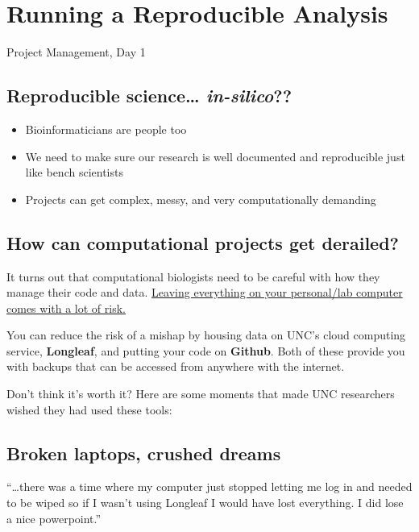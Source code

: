\documentclass[
  letterpaper,
  DIV=11,
  numbers=noendperiod]{scrreprt}
\providecommand{\tightlist}{%
  \setlength{\itemsep}{0pt}\setlength{\parskip}{0pt}}\usepackage{longtable,booktabs,array}
\begin{document}

\chapter{Running a Reproducible
Analysis}\label{running-a-reproducible-analysis}

Project Management, Day 1

\hfill\break

\section{\texorpdfstring{Reproducible science\ldots{}
\emph{in-silico}??}{Reproducible science\ldots{} in-silico??}}\label{reproducible-science-in-silico}

\begin{itemize}
\tightlist
\item
  Bioinformaticians are people too
\item
  We need to make sure our research is well documented and reproducible
  just like bench scientists
\item
  Projects can get complex, messy, and very computationally demanding
\end{itemize}

\section{How can computational projects get
derailed?}\label{how-can-computational-projects-get-derailed}

It turns out that computational biologists need to be careful with how
they manage their code and data. \ul{Leaving everything on your
personal/lab computer comes with a lot of risk.}

You can reduce the risk of a mishap by housing data on UNC's cloud
computing service, \textbf{Longleaf}, and putting your code on
\textbf{Github}. Both of these provide you with backups that can be
accessed from anywhere with the internet.

Don't think it's worth it? Here are some moments that made UNC
researchers wished they had used these tools:

\section{Broken laptops, crushed dreams}

``\ldots there was a time where my computer just stopped letting me log
in and needed to be wiped so if I wasn't using Longleaf I would have
lost everything. I did lose a nice powerpoint.''
\end{document}
